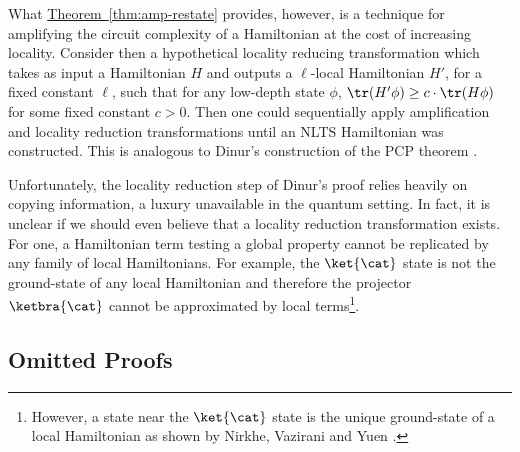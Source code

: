 \documentclass[11pt]{article}
\newcommand{\expref}[2]{\texorpdfstring{\hyperref[#2]{#1~\ref{#2}}}{#1~\ref{#2}}}
\begin{document}
What \expref{Theorem}{thm:amp-restate} provides, however, is a technique for amplifying the circuit complexity of a Hamiltonian at the cost of increasing locality. Consider then a hypothetical locality reducing transformation which takes as input a Hamiltonian $H$ and outputs a $\ell$-local Hamiltonian $H'$, for a fixed constant $\ell$, such that for  any low-depth state $\phi$, $\tr(H' \phi) \geq c \cdot \tr(H \phi)$ for some fixed constant $c > 0$. Then one could sequentially apply amplification and locality reduction transformations until an NLTS Hamiltonian was constructed. This is analogous to Dinur's construction of the PCP theorem \cite{dinur-pcp}. 

Unfortunately, the locality reduction step of Dinur's proof relies heavily on copying information, a luxury unavailable in the quantum setting. In fact, it is unclear if we should even believe that a locality reduction transformation exists. For one, a Hamiltonian term testing a global property cannot be replicated by any family of local Hamiltonians. For example, the $\ket{\cat}$ state is not the ground-state of any local Hamiltonian and therefore the projector $\ketbra{\cat}$ cannot be approximated by local terms\footnote{However, a state near the $\ket{\cat}$ state is the unique ground-state of a local Hamiltonian as shown by Nirkhe, Vazirani and Yuen \cite{nirkhe_et_al:LIPIcs:2018:9095} .}.



\subsection{Omitted Proofs}
\end{document}
